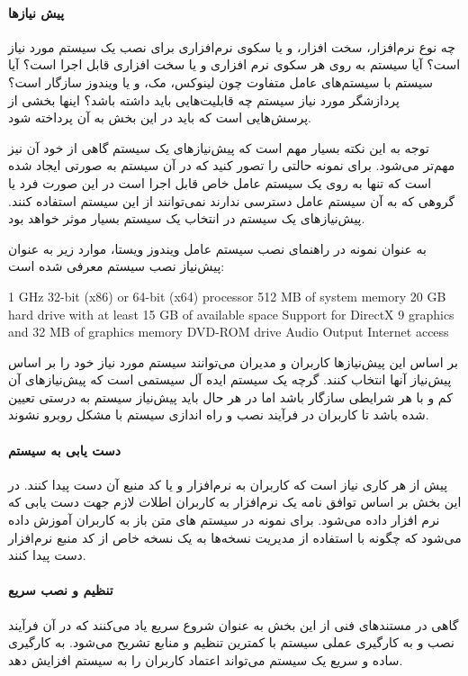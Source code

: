 \paragraph{پیش نیازها}
   چه نوع نرم‌افزار، سخت افزار، و یا سکوی نرم‌افزاری برای نصب یک سیستم مورد نیاز
   است؟ آیا سیستم به روی هر سکوی نرم افزاری و یا سخت افزاری قابل اجرا است؟ آیا
   سیستم با سیستم‌های عامل متفاوت چون لینوکس، مک، و یا ویندوز سازگار است؟
   پردازشگر مورد نیاز سیستم چه قابلیت‌هایی باید داشته باشد؟ اینها بخشی از
   پرسش‌هایی است که باید در این بخش به آن پرداخته شود.

   توجه به این نکته بسیار مهم است که پیش‌نیازهای یک سیستم گاهی از خود آن نیز
   مهم‌تر می‌شود. برای نمونه حالتی را تصور کنید که در آن سیستم به صورتی ایجاد
   شده است که تنها به روی یک سیستم عامل خاص قابل اجرا است در این صورت فرد یا
   گروهی که به آن سیستم عامل دسترسی ندارند نمی‌توانند از این سیستم استفاده کنند.
   پیش‌نیازهای یک سیستم در انتخاب یک سیستم بسیار موثر خواهد بود.

   به عنوان نمونه در راهنمای نصب سیستم عامل ویندوز ویستا، موارد زیر به عنوان
   پیش‌نیاز نصب سیستم معرفی شده است:
\begin{config}
1 GHz 32-bit (x86) or 64-bit (x64) processor
512 MB of system memory
20 GB hard drive with at least 15 GB of available space
Support for DirectX 9 graphics and 32 MB of graphics memory
DVD-ROM drive
Audio Output
Internet access
\end{config}
   بر اساس این پیش‌نیازها کاربران و مدیران می‌توانند سیستم مورد نیاز
   خود را بر اساس پیش‌نیاز آنها انتخاب کنند. گرچه یک سیستم ایده آل سیستمی است که پیش‌نیازهای آن کم و
   با هر شرایطی سازگار باشد اما در هر حال باید پیش‌نیاز سیستم به درستی تعیین شده
   باشد تا کاربران در فرآیند نصب و راه اندازی سیستم با مشکل روبرو نشوند.
   
\paragraph{دست یابی به سیستم}
  پیش از هر کاری نیاز است که کاربران به نرم‌افزار و یا کد منبع آن دست پیدا کنند.
  در این بخش بر اساس توافق نامه یک نرم‌افزار به کاربران اطلات لازم جهت دست یابی
  که نرم افزار داده می‌شود. برای نمونه در سیستم های متن باز به کاربران آموزش
  داده می‌شود که چگونه با استفاده از مدیریت نسخه‌ها به یک نسخه خاص از کد منبع
  نرم‌افزار دست پیدا کنند.
  
\paragraph{تنظیم و نصب سریع}
   گاهی در مستند‌های فنی از این بخش به عنوان شروع سریع یاد می‌کنند که در آن
   فرآیند نصب و به کارگیری عملی سیستم با کمترین تنظیم و منابع تشریح می‌شود. به
   کارگیری ساده و سریع یک سیستم می‌تواند اعتماد کاربران را به سیستم افزایش دهد.

